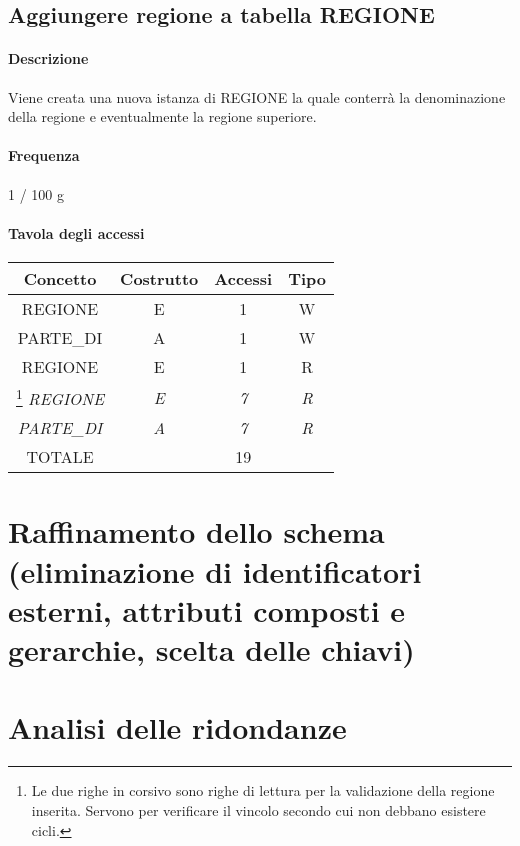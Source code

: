 \documentclass[a4paper,12pt]{report}
\begin{document}
\subsection{Aggiungere regione a tabella REGIONE} \label{aggiungere_regione}
\paragraph{Descrizione} Viene creata una nuova istanza di REGIONE la quale conterrà la denominazione della regione e eventualmente la regione superiore.
\paragraph{Frequenza} 1 / 100 g
\begin{table}[H]
\paragraph{Tavola degli accessi\newline}
\begin{tabular}{|c|c|c|c|}
\hline
Concetto           & Costrutto  & Accessi    & Tipo       \\ \hline
REGIONE            & E          & 1          & W          \\ \hline
PARTE\_DI          & A          & 1          & W          \\ \hline
REGIONE            & E          & 1          & R          \\ \hline
\footnote{Le due righe in corsivo sono righe di lettura per la validazione della regione inserita. Servono per verificare il vincolo secondo cui non debbano esistere cicli.}
\textit{REGIONE}   & \textit{E} & \textit{7} & \textit{R} \\ \hline
\textit{PARTE\_DI} & \textit{A} & \textit{7} & \textit{R} \\ \hline
TOTALE             &            & 19         &            \\ \hline
\end{tabular}
\end{table}
\section{Raffinamento dello schema (eliminazione di identificatori esterni, attributi composti e gerarchie, scelta delle chiavi)}
\section{Analisi delle ridondanze}
\end{document}
